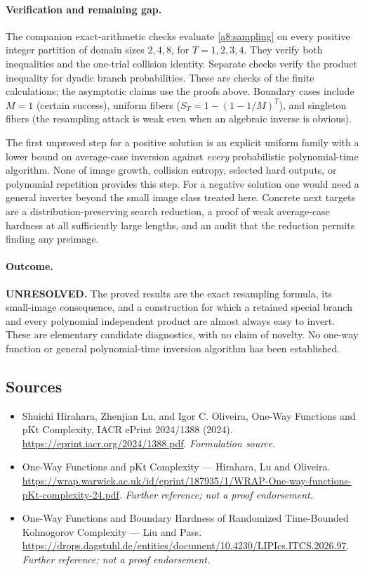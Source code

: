 \documentclass[11pt]{article}
\begin{document}
\paragraph{Verification and remaining gap.}
The companion exact-arithmetic checks evaluate \eqref{a8:sampling} on every
positive integer partition of domain sizes $2,4,8$, for $T=1,2,3,4$.
They verify both inequalities and the one-trial collision identity. Separate
checks verify the product inequality for dyadic branch probabilities. These
are checks of the finite calculations; the asymptotic claims use the proofs
above. Boundary cases include $M=1$ (certain success), uniform fibers
($S_T=1-(1-1/M)^T$), and singleton fibers (the resampling attack is weak even
when an algebraic inverse is obvious).

The first unproved step for a positive solution is an explicit uniform family
with a lower bound on average-case inversion against \emph{every}
probabilistic polynomial-time algorithm. None of image growth, collision
entropy, selected hard outputs, or polynomial repetition provides this step.
For a negative solution one would need a general inverter beyond the small
image class treated here. Concrete next targets are a distribution-preserving
search reduction, a proof of weak average-case hardness at all sufficiently
large lengths, and an audit that the reduction permits finding any preimage.

\paragraph{Outcome.}
\textbf{UNRESOLVED.} The proved results are the exact resampling formula, its
small-image consequence, and a construction for which a retained special
branch and every polynomial independent product are almost always easy to
invert. These are elementary candidate diagnostics, with no claim of novelty.
No one-way function or general polynomial-time inversion algorithm has been
established.

\subsection{Sources}
\begin{itemize}
\item[S1]Shuichi Hirahara, Zhenjian Lu, and Igor C. Oliveira, One-Way Functions and pKt Complexity, IACR ePrint 2024/1388 (2024).
\url{https://eprint.iacr.org/2024/1388.pdf}.
\textit{Formulation source.}
\item[S2]One-Way Functions and pKt Complexity — Hirahara, Lu and Oliveira.
\url{https://wrap.warwick.ac.uk/id/eprint/187935/1/WRAP-One-way-functions-pKt-complexity-24.pdf}.
\textit{Further reference; not a proof endorsement.}
\item[S3]One-Way Functions and Boundary Hardness of Randomized Time-Bounded Kolmogorov Complexity — Liu and Pass.
\url{https://drops.dagstuhl.de/entities/document/10.4230/LIPIcs.ITCS.2026.97}.
\textit{Further reference; not a proof endorsement.}
\end{itemize}
\end{document}
